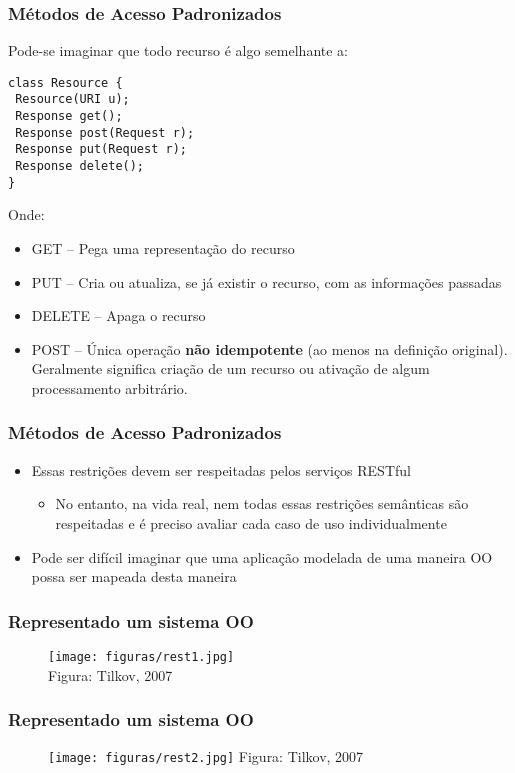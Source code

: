 \documentclass[Ligatures=TeX,table,brazil,svgnames,usetotalslideindicator,comp
ress,10pt]{beamer}
\begin{document}
\begin{frame}[fragile]
  \frametitle{Métodos de Acesso Padronizados}

  Pode-se imaginar que todo recurso é algo
  semelhante a:

\begin{verbatim}
class Resource {
 Resource(URI u);
 Response get();
 Response post(Request r);
 Response put(Request r);
 Response delete();
}
\end{verbatim}
  Onde:
  \begin{itemize}
  \item \alert{GET} – Pega uma representação do recurso
  \item \alert{PUT} – Cria ou atualiza, se já existir o
    recurso, com as informações passadas
  \item \alert{DELETE} – Apaga o recurso
  \item \alert{POST} – Única operação \textbf{não idempotente} (ao menos na
    definição original).  Geralmente significa criação de um recurso
    ou ativação de algum processamento arbitrário.
  \end{itemize}
\end{frame}


\begin{frame}
  \frametitle{Métodos de Acesso Padronizados}
  \begin{itemize}
  \item Essas restrições devem ser respeitadas pelos serviços RESTful
    \begin{itemize}
    \item No entanto, na vida real, nem todas essas restrições
      semânticas são respeitadas e é preciso avaliar cada caso de uso
      individualmente
    \end{itemize}
  \item Pode ser difícil imaginar que uma aplicação modelada de uma
    maneira OO possa ser mapeada desta maneira
  \end{itemize}
\end{frame}


\begin{frame}
  \frametitle{Representado um sistema OO}
  \begin{figure}[ht]
    \centering
    \texttt{[image: figuras/rest1.jpg]}
    \\\tiny{Figura: Tilkov, 2007}
  \end{figure}
\end{frame}

\begin{frame}
  \frametitle{Representado um sistema OO}
  \begin{figure}[ht]
    \centering
    \texttt{[image: figuras/rest2.jpg]}
    \tiny{Figura: Tilkov, 2007}
  \end{figure}
\end{frame}
\end{document}
